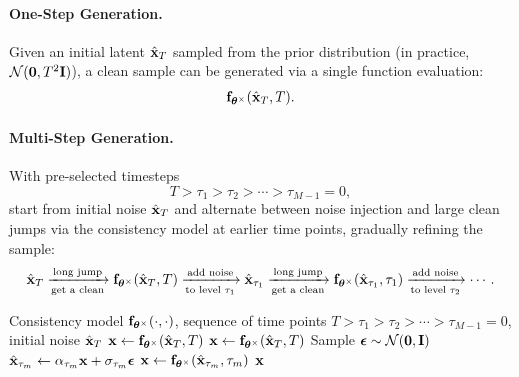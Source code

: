 \paragraph{One-Step Generation.} Given an initial latent $\hat{{\mathbf{x}}}_T$ sampled from the prior distribution (in practice,  $\mathcal{N}(\bm{0}, T^2{\mathbf{I}})$), a clean sample can be generated via a single function evaluation:
\begin{align*}
    {\mathbf{f}}_{\bm{\theta}^\times}(\hat{{\mathbf{x}}}_T, T).
\end{align*}
\paragraph{Multi-Step Generation.} With pre-selected timesteps 
\[
T>\tau_1 > \tau_2 > \cdots > \tau_{M-1}=0,
\]
start from initial noise $\hat{{\mathbf{x}}}_T$ and alternate between noise injection and large clean jumps via the consistency model at earlier time points, gradually refining the sample:
\begin{align*}
    \hat{{\mathbf{x}}}_T \xrightarrow[\text{get a clean}]{\text{long jump}} {\mathbf{f}}_{\bm{\theta}^\times}(\hat{{\mathbf{x}}}_T, T)
    \xrightarrow[\text{to level $\tau_1$}]{\text{add noise}} \hat{{\mathbf{x}}}_{\tau_1}
    \xrightarrow[\text{get a clean}]{\text{long jump}} {\mathbf{f}}_{\bm{\theta}^\times}(\hat{{\mathbf{x}}}_{\tau_1}, \tau_1)
    \xrightarrow[\text{to level $\tau_2$}]{\text{add noise}} \cdots.
\end{align*}

\begin{algorithm}[thb!]
    {\small
        \caption{CM's Sampling with One-Step or Multi-Step Generation \label{alg:cm_sampling}}
    \begin{algorithmic}[1]
        \Require Consistency model ${\mathbf{f}}_{\bm{\theta}^\times}(\cdot, \cdot)$, sequence of time points $T>\tau_1 > \tau_2 > \cdots > \tau_{M-1}=0$, initial noise $\hat{{\mathbf{x}}}_T$
            \State ${\mathbf{x}} \leftarrow {\mathbf{f}}_{\bm{\theta}^\times}(\hat{{\mathbf{x}}}_T, T)$
        \Else
            \State ${\mathbf{x}} \leftarrow {\mathbf{f}}_{\bm{\theta}^\times}(\hat{{\mathbf{x}}}_T, T)$
                \State Sample $\bm{\epsilon} \sim \mathcal{N}(\bm{0}, \mathbf{I})$
                \State $\hat{{\mathbf{x}}}_{\tau_m} \leftarrow \alpha_{\tau_m}{\mathbf{x}} + \sigma_{\tau_m} \bm{\epsilon}$
                \State ${\mathbf{x}} \leftarrow {\mathbf{f}}_{\bm{\theta}^\times}(\hat{{\mathbf{x}}}_{\tau_m}, \tau_m)$
            \EndFor
        \EndIf
        \Ensure ${\mathbf{x}}$
    \end{algorithmic}
    }
\end{algorithm}














